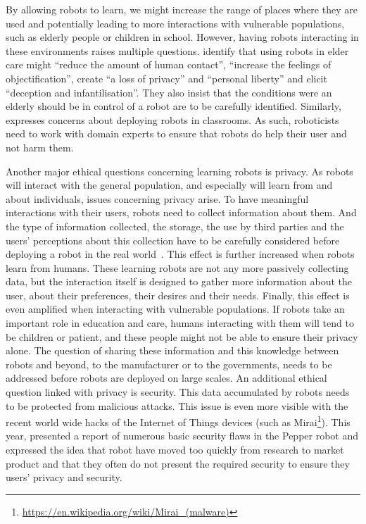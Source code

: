 By allowing robots to learn, we might increase the range of places where they are used and potentially leading to more interactions with vulnerable populations, such as elderly people or children in school. However, having robots interacting in these environments raises multiple questions. \cite{sharkey2012granny} identify that using robots in elder care might ``reduce the amount of human contact'', ``increase the feelings of objectification'', create ``a loss of privacy'' and ``personal liberty'' and elicit ``deception and infantilisation''. They also insist that the conditions were an elderly should be in control of a robot are to be carefully identified. Similarly, \cite{sharkey2016should} expresses concerns about deploying robots in classrooms. As such, roboticists need to work with domain experts to ensure that robots do help their user and not harm them.

Another major ethical questions concerning learning robots is privacy. As robots will interact with the general population, and especially will learn from and about individuals, issues concerning privacy arise. To have meaningful interactions with their users, robots need to collect information about them. And the type of information collected, the storage, the use by third parties and the users' perceptions about this collection have to be carefully considered before deploying a robot in the real world~\citep{syrdal2007he}. This effect is further increased when robots learn from humans. These learning robots are not any more passively collecting data, but the interaction itself is designed to gather more information about the user, about their preferences, their desires and their needs. Finally, this effect is even amplified when interacting with vulnerable populations. If robots take an important role in education and care, humans interacting with them will tend to be children or patient, and these people might not be able to ensure their privacy alone. The question of sharing these information and this knowledge between robots and beyond, to the manufacturer or to the governments, needs to be addressed before robots are deployed on large scales. An additional ethical question linked with privacy is security. This data accumulated by robots needs to be protected from malicious attacks. This issue is even more visible with the recent world wide hacks of the Internet of Things devices (such as Mirai\footnote{\url{https://en.wikipedia.org/wiki/Mirai_(malware)}}). This year, \cite{giaretta2018adding} presented a report of numerous basic security flaws in the Pepper robot and expressed the idea that robot have moved too quickly from research to market product and that they often do not present the required security to ensure they users' privacy and security.

